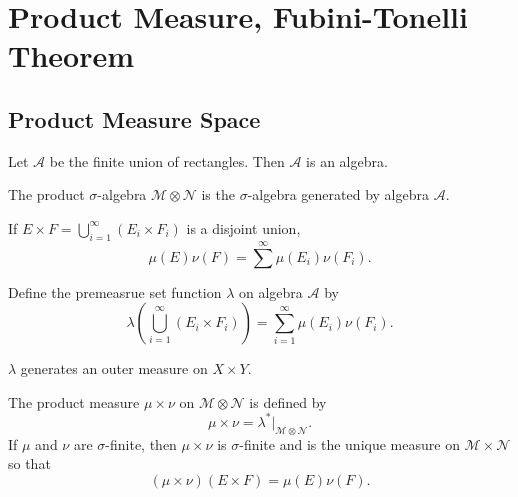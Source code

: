 \documentclass[class=book, crop=false]{standalone}
\begin{document}
    \section{Product Measure, Fubini-Tonelli Theorem}
        \subsection{Product Measure Space}
        \begin{theorem}
            Let $\mathscr{A}$ be the finite union of rectangles. Then $\mathscr{A}$ is an algebra.
        \end{theorem}

        \begin{definition}
            The product $\sigma$-algebra $\mathscr{M} \otimes \mathscr{N}$ is the $\sigma$-algebra generated by algebra $\mathscr{A}$.
        \end{definition}

        \begin{theorem}
            If $E \times F = \bigcup^{\infty}_{i = 1} (E_i \times F_i)$ is a disjoint union,
            \begin{equation*}
                \mu(E) \nu(F) = \sum^{\infty} \mu(E_i) \nu(F_i).
            \end{equation*}
        \end{theorem}

        \begin{definition}
            Define the premeasrue set function $\lambda$ on algebra $\mathscr{A}$ by
            \begin{equation*}
                \lambda\left(\bigcup^{\infty}_{i = 1} (E_i \times F_i)\right) = \sum^{\infty}_{i = 1} \mu(E_i) \nu(F_i).
            \end{equation*}
        \end{definition}
        \begin{remark}
            $\lambda$ generates an outer measure on $X \times Y$.
        \end{remark}

        \begin{definition}
            The product measure $\mu \times \nu$ on $\mathscr{M} \otimes \mathscr{N}$ is defined by
            \begin{equation*}
                \mu \times \nu = \lambda^*|_{\mathscr{M} \otimes \mathscr{N}}.
            \end{equation*}
            If $\mu$ and $\nu$ are $\sigma$-finite, then $\mu \times \nu$ is $\sigma$-finite and is the unique measure on $\mathscr{M} \times \mathscr{N}$ so that
            \begin{equation*}
                (\mu \times \nu)(E \times F) = \mu(E) \nu(F).
            \end{equation*}
        \end{definition}
\end{document}
